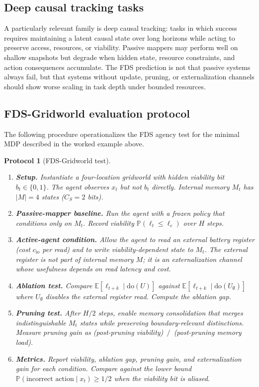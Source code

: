 \documentclass[10pt,a4paper,twocolumn,aps,prl]{revtex4-2}
\newtheorem{protocol}{Protocol}
\newcommand{\E}{\mathbb{E}}
\newcommand{\Prob}{\mathbb{P}}
\newcommand{\doop}{\mathrm{do}}
\begin{document}
\subsection{Deep causal tracking tasks}

A particularly relevant family is deep causal tracking: tasks in which success requires maintaining a latent causal state over long horizons while acting to preserve access, resources, or viability. Passive mappers may perform well on shallow snapshots but degrade when hidden state, resource constraints, and action consequences accumulate. The FDS prediction is not that passive systems always fail, but that systems without update, pruning, or externalization channels should show worse scaling in task depth under bounded resources.

\subsection{FDS-Gridworld evaluation protocol}

The following procedure operationalizes the FDS agency test for the minimal MDP described in the worked example above.

\begin{protocol}[FDS-Gridworld test]
\begin{enumerate}[leftmargin=2em]
    \item \textbf{Setup.} Instantiate a four-location gridworld with hidden viability bit $b_t\in\{0,1\}$. The agent observes $x_t$ but not $b_t$ directly. Internal memory $M_t$ has $|M|=4$ states ($C_S=2$ bits).
    \item \textbf{Passive-mapper baseline.} Run the agent with a frozen policy that conditions only on $M_t$. Record viability $\Prob(\ell_t\leq\ell_c)$ over $H$ steps.
    \item \textbf{Active-agent condition.} Allow the agent to read an external battery register (cost $c_{\mathrm{io}}$ per read) and to write viability-dependent state to $M_t$. The external register is not part of internal memory $M$; it is an externalization channel whose usefulness depends on read latency and cost.
    \item \textbf{Ablation test.} Compare $\E[\ell_{t+k}\mid\doop(U)]$ against $\E[\ell_{t+k}\mid\doop(U_{\emptyset})]$ where $U_{\emptyset}$ disables the external register read. Compute the ablation gap.
    \item \textbf{Pruning test.} After $H/2$ steps, enable memory consolidation that merges indistinguishable $M_t$ states while preserving boundary-relevant distinctions. Measure pruning gain as (post-pruning viability)~$/$~(post-pruning memory load).
    \item \textbf{Metrics.} Report viability, ablation gap, pruning gain, and externalization gain for each condition. Compare against the lower bound $\Prob(\text{incorrect action}\mid x_t)\ge 1/2$ when the viability bit is aliased.
\end{enumerate}
\end{protocol}
\end{document}
